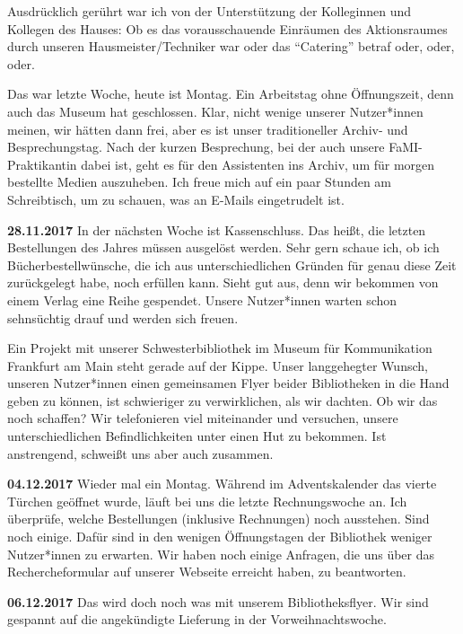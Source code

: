 \documentclass[a4paper,
fontsize=11pt,
oneside,
numbers=noperiodatend,
parskip=half-,
bibliography=totoc,
final
]{scrartcl}
\begin{document}
Ausdrücklich gerührt war ich von der Unterstützung der Kolleginnen und
Kollegen des Hauses: Ob es das vorausschauende Einräumen des
Aktionsraumes durch unseren Hausmeister/Techniker war oder das
\enquote{Catering} betraf oder, oder, oder.

Das war letzte Woche, heute ist Montag. Ein Arbeitstag ohne
Öffnungszeit, denn auch das Museum hat geschlossen. Klar, nicht wenige
unserer Nutzer*innen meinen, wir hätten dann frei, aber es ist unser
traditioneller Archiv- und Besprechungstag. Nach der kurzen Besprechung,
bei der auch unsere FaMI-Praktikantin dabei ist, geht es für den
Assistenten ins Archiv, um für morgen bestellte Medien auszuheben. Ich
freue mich auf ein paar Stunden am Schreibtisch, um zu schauen, was an
E-Mails eingetrudelt ist.

\textbf{28.11.2017} In der nächsten Woche ist Kassenschluss. Das heißt,
die letzten Bestellungen des Jahres müssen ausgelöst werden. Sehr gern
schaue ich, ob ich Bücherbestellwünsche, die ich aus unterschiedlichen
Gründen für genau diese Zeit zurückgelegt habe, noch erfüllen kann.
Sieht gut aus, denn wir bekommen von einem Verlag eine Reihe gespendet.
Unsere Nutzer*innen warten schon sehnsüchtig drauf und werden sich
freuen.

Ein Projekt mit unserer Schwesterbibliothek im Museum für Kommunikation
Frankfurt am Main steht gerade auf der Kippe. Unser langgehegter Wunsch,
unseren Nutzer*innen einen gemeinsamen Flyer beider Bibliotheken in die
Hand geben zu können, ist schwieriger zu verwirklichen, als wir dachten.
Ob wir das noch schaffen? Wir telefonieren viel miteinander und
versuchen, unsere unterschiedlichen Befindlichkeiten unter einen Hut zu
bekommen. Ist anstrengend, schweißt uns aber auch zusammen.

\textbf{04.12.2017} Wieder mal ein Montag. Während im Adventskalender
das vierte Türchen geöffnet wurde, läuft bei uns die letzte
Rechnungswoche an. Ich überprüfe, welche Bestellungen (inklusive
Rechnungen) noch ausstehen. Sind noch einige. Dafür sind in den wenigen
Öffnungstagen der Bibliothek weniger Nutzer*innen zu erwarten. Wir haben
noch einige Anfragen, die uns über das Rechercheformular auf unserer
Webseite erreicht haben, zu beantworten.

\textbf{06.12.2017} Das wird doch noch was mit unserem Bibliotheksflyer.
Wir sind gespannt auf die angekündigte Lieferung in der
Vorweihnachtswoche.
\end{document}
